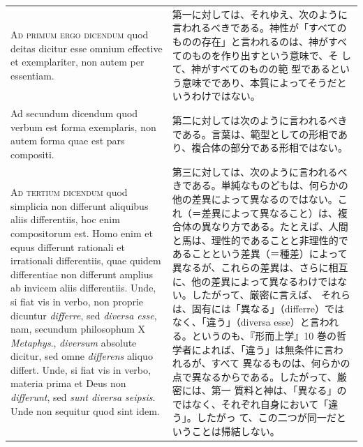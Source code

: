 \documentclass[paper=a4paper,fontsize=10pt,jafontsize=9pt,titlepage]{jlreq}
\begin{document}
\begin{longtable}{p{21em}p{21em}}
\\

{\scshape Ad primum ergo dicendum} quod deitas dicitur esse omnium
 effective et exemplariter, non autem per essentiam.
&

第一に対しては、それゆえ、次のように言われるべきである。神性が「すべての
 ものの存在」と言われるのは、神がすべてのものを作り出すという意味で、そ
 して、神がすべてのものの範
 型であるという意味でであり、本質によってそうだというわけではない。

\\

Ad secundum dicendum{\scshape } quod verbum est forma exemplaris, non
 autem forma quae est pars compositi.
&

第二に対しては次のように言われるべきである。言葉は、範型としての形相であ
 り、複合体の部分である形相ではない。

\\

{\scshape Ad tertium dicendum} quod simplicia non differunt aliquibus
 aliis differentiis, hoc enim compositorum est. Homo enim et equus
 differunt rationali et irrationali differentiis, quae quidem
 differentiae non differunt amplius ab invicem aliis differentiis. Unde,
 si fiat vis in verbo, non proprie dicuntur {\itshape differre}, sed {\itshape diversa esse},
 nam, secundum philosophum X {\itshape Metaphys}., {\itshape diversum} absolute dicitur, sed
 omne {\itshape differens} aliquo differt. Unde, si fiat vis in verbo, materia
 prima et Deus non {\itshape differunt}, sed {\itshape sunt diversa seipsis}. Unde non
 sequitur quod sint idem.
&

第三に対しては、次のように言われるべきである。単純なものどもは、何らかの
 他の差異によって異なるのではない。これ（＝差異によって異なること）は、複
 合体の異なり方である。たとえば、人間と馬は、理性的であることと非理性的で
 あることという差異（＝種差）によって異なるが、これらの差異は、さらに相互
 に、他の差異によって異なるわけではない。したがって、厳密に言えば、
それらは、固有には「異なる」（differre）ではなく、「違う」（diversa esse）と言われる。というのも、『形而上学』10 巻の哲学者によれば、「違う」は無条件に言われるが、すべて
 異なるものは、何らかの点で異なるからである。したがって、厳密には、第一
 質料と神は、「異なる」のではなく、それぞれ自身において「違う」。したがっ
 て、この二つが同一だということは帰結しない。


\end{longtable}
\end{document}
